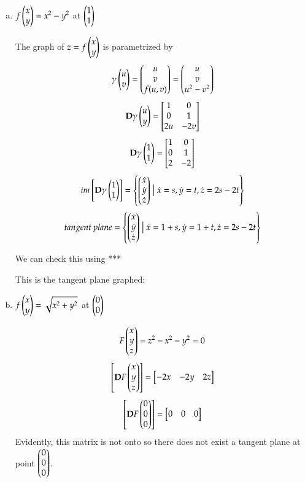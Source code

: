 \begin{enumerate}[a.]
  \item $\displaystyle f\Point{x \\ y} = x^2 - y^2$ at $\Point{1 \\ 1}$


  The graph of $z=f\Point{x \\ y}$ is parametrized by
  \[\gamma\Point{u \\ v}=\Point{u \\ v \\ f(u,v)}=\Point{u \\ v \\ u^2-v^2}\]
  \[\bm{D}\gamma\Point{u \\ y}=\mtrx{1 & 0 \\ 0 & 1 \\ 2u & -2v}\]
  \[\bm{D}\gamma\Point{1 \\ 1}=\mtrx{1 & 0 \\ 0 & 1 \\ 2 & -2}\]
  \[im \left[\bm{D}\gamma\Point{1 \\ 1}\right] = \Set{\Point{\dot{x} \\ \dot{y} \\ \dot{z}} \bigm| \dot{x} = s, \dot{y} = t, \dot{z}=2s-2t}\]
  \[tangent\ plane = \Set{\Point{\dot{x} \\ \dot{y} \\ \dot{z}} \bigm| \dot{x} = 1 + s, \dot{y} = 1 + t, \dot{z}=2s-2t}\]

  We can check this using ***
  
  This is the tangent plane graphed: 
  

  \item $\displaystyle f\Point{x \\ y} = \sqrt{x^2+y^2}$ at $\Point{0 \\ 0}$
  
  \[F\Point{x \\ y \\ z} = z^2 - x^2 - y^2 = 0\]
  \[\mtrx{\bm{D}F\Point{x \\ y \\ z}}=\mtrx{-2x & -2y & 2z}\]
  \[\mtrx{\bm{D}F\Point{0 \\ 0 \\ 0}}=\mtrx{0 & 0 & 0}\]
  Evidently, this matrix is not onto so there does not exist a tangent plane at point $\Point{0 \\ 0 \\ 0}$.


\end{enumerate}
